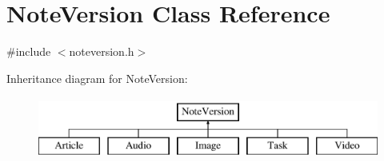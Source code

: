 \hypertarget{class_note_version}{}\section{Note\+Version Class Reference}
\label{class_note_version}


{\ttfamily \#include $<$noteversion.\+h$>$}

Inheritance diagram for Note\+Version\+:\begin{figure}[H]
\begin{center}
\leavevmode
\includegraphics[height=2.000000cm]{class_note_version}
\end{center}
\end{figure}
